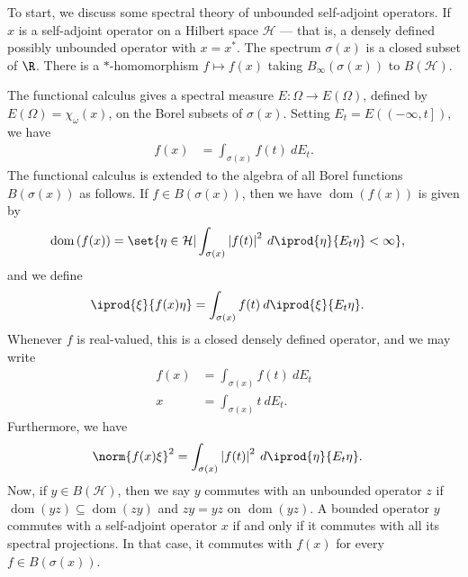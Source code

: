 \documentclass[10pt]{mypackage}
\begin{document}
To start, we discuss some spectral theory of unbounded self-adjoint operators. If $x$ is a self-adjoint operator on a Hilbert space $\mathcal{H}$ --- that is, a densely defined possibly unbounded operator with $x = x^{\ast}$. The spectrum $\sigma\left( x \right)$ is a closed subset of $\R$. There is a $\ast$-homomorphism $f\mapsto f(x)$ taking $B_{\infty}\left( \sigma(x) \right)$ to $B\left( \mathcal{H} \right)$.

The functional calculus gives a spectral measure $E\colon \Omega\rightarrow E(\Omega)$, defined by $E(\Omega) = \chi_{\omega}(x)$, on the Borel subsets of $\sigma(x)$. Setting $E_t = E\left( \left( -\infty,t \right] \right)$, we have
\begin{align*}
  f(x) &= \int_{\sigma(x)}^{} f(t)\:dE_t.
\end{align*}
The functional calculus is extended to the algebra of all Borel functions $B\left(\sigma(x)\right)$ as follows. If $f\in B\left( \sigma(x) \right)$, then we have $\operatorname{dom}\left( f(x) \right)$ is given by
\begin{align*}
  \operatorname{dom}\left( f(x) \right) &= \set{\eta\in \mathcal{H} | \int_{\sigma(x)}^{} \left\vert f(t) \right\vert^2\:d \iprod{\eta}{E_t\eta} < \infty},
\end{align*}
and we define
\begin{align*}
  \iprod{\xi}{f(x)\eta} &= \int_{\sigma(x)}^{} f(t)\:d \iprod{\xi}{E_t\eta}.
\end{align*}
Whenever $f$ is real-valued, this is a closed densely defined operator, and we may write
\begin{align*}
  f(x) &= \int_{\sigma(x)}^{} f(t)\:dE_t\\
  x &= \int_{\sigma(x)}^{} t\:dE_t.
\end{align*}
Furthermore, we have
\begin{align*}
  \norm{f(x)\xi}^2 &= \int_{\sigma(x)}^{} \left\vert f(t) \right\vert^2\:d \iprod{\eta}{E_t\eta}.
\end{align*}
Now, if $y\in B\left( \mathcal{H} \right)$, then we say $y$ commutes with an unbounded operator $z$ if $\operatorname{dom}\left( yz \right)\subseteq \operatorname{dom}\left( zy \right)$ and $zy = yz$ on $\operatorname{dom}\left( yz \right)$. A bounded operator $y$ commutes with a self-adjoint operator $x$ if and only if it commutes with all its spectral projections. In that case, it commutes with $f(x)$ for every $f\in B\left( \sigma(x) \right)$.
\end{document}
